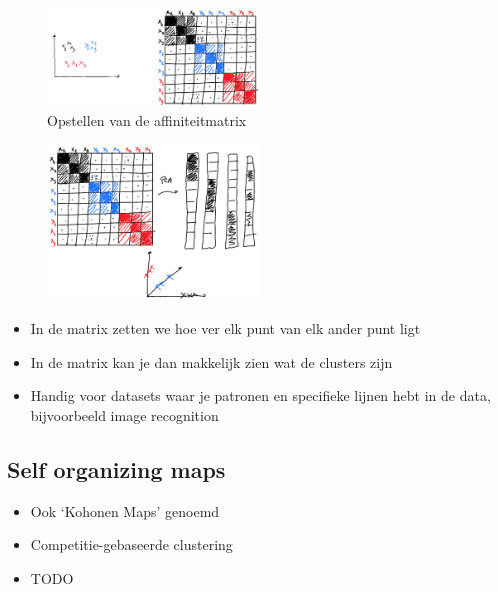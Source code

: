 \documentclass{article}
\begin{document}
\begin{figure}[H]
    \centering
    \includegraphics[width=0.5\textwidth]{spectral-clustering2.png}
    \caption{Opstellen van de affiniteitmatrix}
\end{figure}

\begin{figure}[H]
    \centering
    \includegraphics[width=0.5\textwidth]{spectral-clustering3.png}
\end{figure}

\begin{itemize}
    \item In de matrix zetten we hoe ver elk punt van elk ander punt ligt
    \item In de matrix kan je dan makkelijk zien wat de clusters zijn
    \item Handig voor datasets waar je patronen en specifieke lijnen hebt in de data, bijvoorbeeld image recognition
\end{itemize}

\subsection{Self organizing maps}

\begin{itemize}
    \item Ook `Kohonen Maps' genoemd
    \item Competitie-gebaseerde clustering
    \item TODO
\end{itemize}
\end{document}
